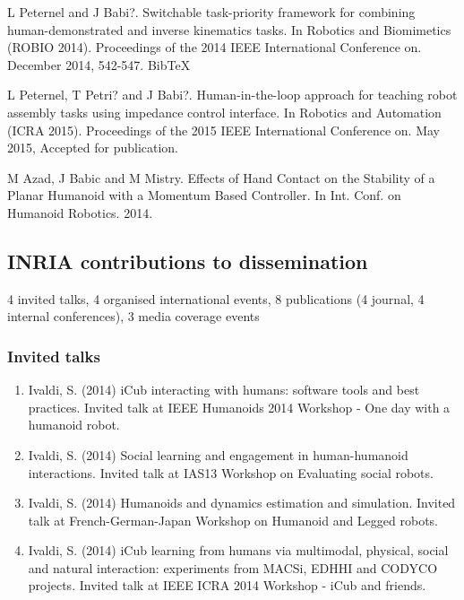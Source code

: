 L Peternel and J Babi?. Switchable task-priority framework for combining human-demonstrated and inverse kinematics tasks. In Robotics and Biomimetics (ROBIO 2014). Proceedings of the 2014 IEEE International Conference on. December 2014, 542-547. BibTeX

L Peternel, T Petri? and J Babi?. Human-in-the-loop approach for teaching robot assembly tasks using impedance control interface. In Robotics and Automation (ICRA 2015). Proceedings of the 2015 IEEE International Conference on. May 2015, Accepted for publication. 

M Azad, J Babic and M Mistry. Effects of Hand Contact on the Stability of a Planar Humanoid with a Momentum Based Controller. In Int. Conf. on Humanoid Robotics. 2014.

\subsection{INRIA contributions to dissemination}

4 invited talks, 4 organised international events, 8 publications (4 journal, 4 internal conferences), 3 media coverage events

\subsubsection{Invited talks}
\begin{enumerate}
\item Ivaldi, S. (2014) iCub interacting with humans: software tools and best practices. Invited talk at IEEE Humanoids 2014 Workshop - One day with a humanoid robot.
\item Ivaldi, S. (2014) Social learning and engagement in human-humanoid interactions. Invited talk at IAS13 Workshop on Evaluating social robots.
\item  Ivaldi, S. (2014) Humanoids and dynamics estimation and simulation. Invited talk at French-German-Japan Workshop on Humanoid and Legged robots.
\item Ivaldi, S. (2014) iCub learning from humans via multimodal, physical, social and natural interaction: experiments from MACSi, EDHHI and CODYCO projects. Invited talk at IEEE ICRA 2014 Workshop - iCub and friends.
\end{enumerate}


